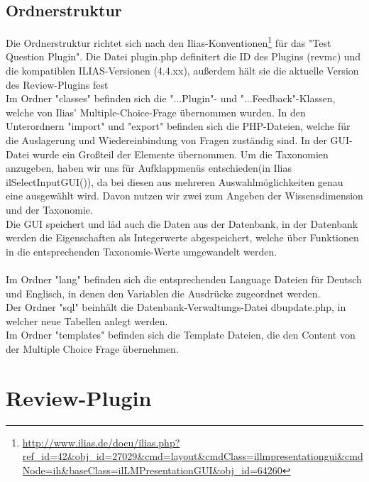 \documentclass[a4paper]{scrreprt}
\begin{document}
\subsection{Ordnerstruktur}
Die Ordnerstruktur richtet sich nach den Ilias-Konventionen\footnote{\url{http://www.ilias.de/docu/ilias.php?ref_id=42&obj_id=27029&cmd=layout&cmdClass=illmpresentationgui&cmdNode=ih&baseClass=ilLMPresentationGUI&obj_id=64260}} für das "Test Question Plugin". Die Datei plugin.php definitert die ID des Plugins (revmc) und die kompatiblen ILIAS-Versionen (4.4.xx), außerdem hält sie die aktuelle Version des Review-Plugins fest\\
Im Ordner "classes" befinden sich die "...Plugin"- und "...Feedback"-Klassen, welche von Ilias' Multiple-Choice-Frage übernommen wurden. In den Unterordnern "import" und "export" befinden sich die PHP-Dateien, welche für die Auslagerung und Wiedereinbindung von Fragen zuständig sind. 
In der GUI-Datei wurde ein Großteil der Elemente übernommen. Um die Taxonomien anzugeben, haben wir uns für Aufklappmenüs entschieden(in Ilias ilSelectInputGUI()), da bei diesen aus mehreren Auswahlmöglichkeiten genau eine ausgewählt wird. Davon nutzen wir zwei zum Angeben der Wissensdimension und der Taxonomie.\\
Die GUI speichert und läd auch die Daten aus der Datenbank, in der Datenbank werden die Eigenschaften als Integerwerte abgespeichert, welche über Funktionen in die entsprechenden Taxonomie-Werte umgewandelt werden.\\
\\
Im Ordner "lang" befinden sich die entsprechenden Language Dateien für Deutsch und Englisch, in denen den Variablen die Ausdrücke zugeordnet werden.\\
Der Ordner "sql" beinhält die Datenbank-Verwaltungs-Datei dbupdate.php, in welcher neue Tabellen anlegt werden.\\
Im Ordner "templates" befinden sich die Template Dateien, die den Content von der Multiple Choice Frage übernehmen.

\section{Review-Plugin}
\end{document}
